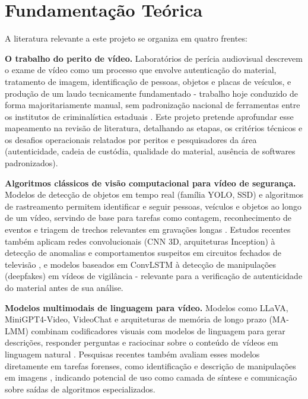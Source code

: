 \section*{Fundamentação Teórica}

A literatura relevante a este projeto se organiza em quatro frentes:

\textbf{O trabalho do perito de vídeo.} Laboratórios de perícia audiovisual descrevem o exame de vídeo como um processo que envolve autenticação do material, tratamento de imagem, identificação de pessoas, objetos e placas de veículos, e produção de um laudo tecnicamente fundamentado - trabalho hoje conduzido de forma majoritariamente manual, sem padronização nacional de ferramentas entre os institutos de criminalística estaduais \cite{ipog_pericia_audiovisual,mppr_pericias_audiovisuais,oliveira2022comparativo}. Este projeto pretende aprofundar esse mapeamento na revisão de literatura, detalhando as etapas, os critérios técnicos e os desafios operacionais relatados por peritos e pesquisadores da área (autenticidade, cadeia de custódia, qualidade do material, ausência de softwares padronizados).

\textbf{Algoritmos clássicos de visão computacional para vídeo de segurança.} Modelos de detecção de objetos em tempo real (família YOLO, SSD) e algoritmos de rastreamento permitem identificar e seguir pessoas, veículos e objetos ao longo de um vídeo, servindo de base para tarefas como contagem, reconhecimento de eventos e triagem de trechos relevantes em gravações longas \cite{sciencedirect_anomaly_detection,arxiv_video_analytics_deployment}. Estudos recentes também aplicam redes convolucionais (CNN 3D, arquiteturas Inception) à detecção de anomalias e comportamentos suspeitos em circuitos fechados de televisão \cite{researchgate_suspicious_activity}, e modelos baseados em ConvLSTM à detecção de manipulações (deepfakes) em vídeos de vigilância \cite{springer_deepfake_cctv} - relevante para a verificação de autenticidade do material antes de sua análise.

\textbf{Modelos multimodais de linguagem para vídeo.} Modelos como LLaVA, MiniGPT4-Video, VideoChat e arquiteturas de memória de longo prazo (MA-LMM) combinam codificadores visuais com modelos de linguagem para gerar descrições, responder perguntas e raciocinar sobre o conteúdo de vídeos em linguagem natural \cite{arxiv_minigpt4video,arxiv_malmm,arxiv_video_llm_survey}. Pesquisas recentes também avaliam esses modelos diretamente em tarefas forenses, como identificação e descrição de manipulações em imagens \cite{arxiv_gpt_forensics}, indicando potencial de uso como camada de síntese e comunicação sobre saídas de algoritmos especializados.

